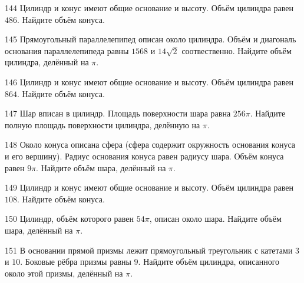 \documentclass[4apaper]{article}
\begin{document}
\begin{taskBN}{144}
Цилиндр и конус имеют общие основание и высоту. Объём цилиндра равен $486$. Найдите объём конуса.
\end{taskBN}

\begin{taskBN}{145}
Прямоугольный параллелепипед описан около цилиндра. Объём и диагональ основания параллелепипеда равны $1568$ и $14\sqrt{2}$ соотвественно. Найдите объём цилиндра, делённый на $\pi$.
\end{taskBN}

\begin{taskBN}{146}
Цилиндр и конус имеют общие основание и высоту. Объём цилиндра равен $864$. Найдите объём конуса.
\end{taskBN}

\begin{taskBN}{147}
Шар вписан в цилиндр. Площадь поверхности шара равна $256\pi$. Найдите полную площадь поверхности цилиндра, делённую на $\pi$.
\end{taskBN}

\begin{taskBN}{148}
Около конуса описана сфера (сфера содержит окружность основания конуса и его вершину).  Радиус основания конуса равен радиусу шара. Объём конуса равен $9\pi$. Найдите объём шара, делённый на $\pi$.
\end{taskBN}

\begin{taskBN}{149}
Цилиндр и конус имеют общие основание и высоту. Объём цилиндра равен $108$. Найдите объём конуса.
\end{taskBN}

\begin{taskBN}{150}
 Цилиндр, объём которого равен $54\pi$, описан около шара. Найдите объём шара, делённый на $\pi$.
\end{taskBN}

\begin{taskBN}{151}
В основании прямой призмы лежит прямоугольный треугольник с катетами $3$ и $10$. Боковые рёбра призмы равны $9$. Найдите объём цилиндра, описанного около этой призмы, делённый на $\pi$.
\end{taskBN}
\end{document}

